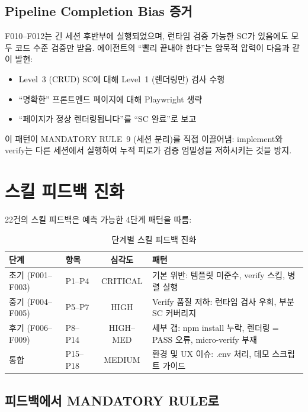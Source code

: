 \documentclass[11pt,a4paper,openright,twoside]{report}
\begin{document}
\subsection{Pipeline Completion Bias 증거}

F010--F012는 긴 세션 후반부에 실행되었으며, 런타임 검증 가능한 SC가 있음에도 모두 코드 수준 검증만 받음. 에이전트의 ``빨리 끝내야 한다''는 암묵적 압력이 다음과 같이 발현:

\begin{itemize}[nosep]
  \item Level~3 (CRUD) SC에 대해 Level~1 (렌더링만) 검사 수행
  \item ``명확한'' 프론트엔드 페이지에 대해 Playwright 생략
  \item ``페이지가 정상 렌더링됩니다''를 ``SC 완료''로 보고
\end{itemize}

이 패턴이 MANDATORY RULE~9 (세션 분리)를 직접 이끌어냄: implement와 verify는 다른 세션에서 실행하여 누적 피로가 검증 엄밀성을 저하시키는 것을 방지.

\section{스킬 피드백 진화}

22건의 스킬 피드백은 예측 가능한 4단계 패턴을 따름:

\begin{table}[H]
\centering
\caption{단계별 스킬 피드백 진화}
\label{tab:aegis-feedback-ko}
\begin{tabularx}{\textwidth}{llcX}
\toprule
\textbf{단계} & \textbf{항목} & \textbf{심각도} & \textbf{패턴} \\
\midrule
초기 (F001--F003) & P1--P4 & CRITICAL & 기본 위반: 템플릿 미준수, verify 스킵, 병렬 실행 \\
중기 (F004--F005) & P5--P7 & HIGH & Verify 품질 저하: 런타임 검사 우회, 부분 SC 커버리지 \\
후기 (F006--F009) & P8--P14 & HIGH--MED & 세부 갭: npm install 누락, 렌더링$=$PASS 오류, micro-verify 부재 \\
통합 & P15--P18 & MEDIUM & 환경 및 UX 이슈: .env 처리, 데모 스크립트 가이드 \\
\bottomrule
\end{tabularx}
\end{table}

\subsection{피드백에서 MANDATORY RULE로}
\end{document}
